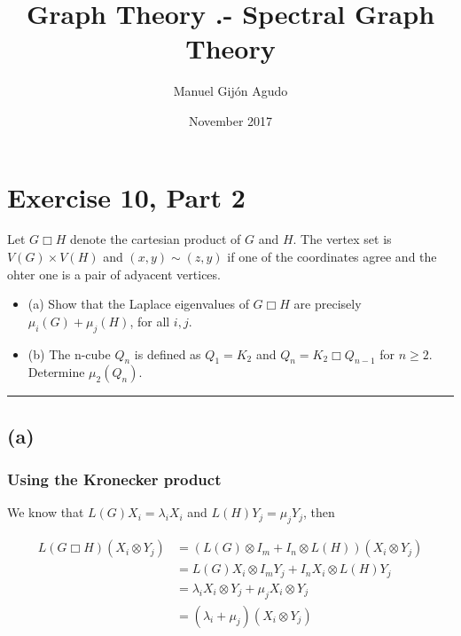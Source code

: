 \documentclass{article}
\title{Graph Theory .- Spectral Graph Theory}
\author{Manuel Gijón Agudo}
\date{November 2017}
\begin{document}
\newtheorem{teo}{Theorem}[chapter] 

\maketitle

\section*{Exercise 10, Part 2}


Let $G\Box H$ denote the cartesian product of $G$ and $H$. The vertex set is $V(G) \times V(H)$ and $(x, y) \sim (z, y)$ if one of the coordinates agree and the ohter one is a pair of adyacent vertices.

\begin{itemize}
    \item (a) Show that the Laplace eigenvalues of $G \Box H$ are precisely $\mu_{i} (G) + \mu_{j} (H)$, for all $i, j$.
    \item (b) The n-cube $Q_{n}$ is defined as $Q_{1} = K_{2}$ and $Q_{n} = K_{2} \Box Q_{n-1}$ for $n \ge 2$.  Determine $\mu_{2}(Q_{n})$.

\end{itemize}
\par
\noindent
{\color{gray} \rule{\linewidth}{0.5mm} }

\subsection*{(a)}

\subsubsection*{Using the Kronecker product}

We know that $L(G) X_i = \lambda_i X_i$ and $L(H) Y_j = \mu_j Y_j$, then

\begin{align}
\nonumber L(G \Box H) (X_i \otimes Y_j) & = (L(G) \otimes I_m + I_n \otimes L(H)) (X_i \otimes Y_j) \\\nonumber &  = L(G) X_i \otimes I_m Y_j + I_n X_i \otimes L(H) Y_j \\ \nonumber &   = \lambda_i X_i \otimes Y_j + \mu_j X_i \otimes Y_j  \\ \nonumber & = (\lambda_i + \mu_j)(X_i \otimes Y_j)\\ \nonumber
\end{align}
\end{document}
